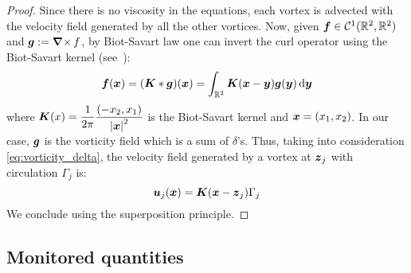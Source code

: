 \documentclass[../main.tex]{subfiles}
\begin{document}
\begin{proof}
	Since there is no viscosity in the equations, each vortex is advected with the velocity field generated by all the other vortices. Now, given $\boldsymbol{f}\in \mathcal{C}^1(\mathbb{R}^2,\mathbb{R}^2)$ and $\boldsymbol{g}:=\operatorname{\boldsymbol{\nabla}\times} f$, by Biot-Savart law one can invert the curl operator using the Biot-Savart kernel (see~\cite{Griffiths}):
	\begin{equation}
		\boldsymbol{f}(\boldsymbol{x}) = (\boldsymbol{K} * \boldsymbol{g})(\boldsymbol{x}) = \int_{\mathbb{R}^2} \boldsymbol{K}(\boldsymbol{x}-\boldsymbol{y}) \boldsymbol{g}(\boldsymbol{y}) \dd{\boldsymbol{y}}
	\end{equation}
	where $\displaystyle\boldsymbol{K}(x) = \frac{1}{2\pi} \frac{(-x_2,x_1)}{{\abs{\boldsymbol{x}}^2}}$ is the Biot-Savart kernel and $\boldsymbol{x}=(x_1,x_2)$. In our case, $\boldsymbol{g}$ is the vorticity field which is a sum of $\delta$'s. Thus, taking into consideration \cref{eq:vorticity_delta}, the velocity field generated by a vortex at $\boldsymbol{z}_j$ with circulation $\Gamma_j$ is:
	\begin{equation}
		\boldsymbol{u}_j(\boldsymbol{x}) = \boldsymbol{K}(\boldsymbol{x}-\boldsymbol{z}_j) \Gamma_j
	\end{equation}
	We conclude using the superposition principle.
\end{proof}

\subsection{Monitored quantities}
\end{document}
